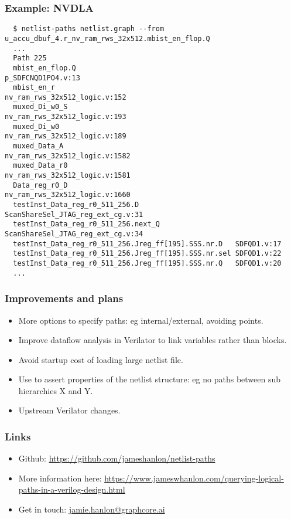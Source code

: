 \documentclass[professionalfonts]{beamer}
\begin{document}
\begin{frame}[fragile]
  \frametitle{Example: NVDLA}
  \tiny
  \begin{verbatim}
  $ netlist-paths netlist.graph --from u_accu_dbuf_4.r_nv_ram_rws_32x512.mbist_en_flop.Q
  ...
  Path 225
  mbist_en_flop.Q                                      p_SDFCNQD1PO4.v:13
  mbist_en_r                                           nv_ram_rws_32x512_logic.v:152
  muxed_Di_w0_S                                        nv_ram_rws_32x512_logic.v:193
  muxed_Di_w0                                          nv_ram_rws_32x512_logic.v:189
  muxed_Data_A                                         nv_ram_rws_32x512_logic.v:1582
  muxed_Data_r0                                        nv_ram_rws_32x512_logic.v:1581
  Data_reg_r0_D                                        nv_ram_rws_32x512_logic.v:1660
  testInst_Data_reg_r0_511_256.D                       ScanShareSel_JTAG_reg_ext_cg.v:31
  testInst_Data_reg_r0_511_256.next_Q                  ScanShareSel_JTAG_reg_ext_cg.v:34
  testInst_Data_reg_r0_511_256.Jreg_ff[195].SSS.nr.D   SDFQD1.v:17
  testInst_Data_reg_r0_511_256.Jreg_ff[195].SSS.nr.sel SDFQD1.v:22
  testInst_Data_reg_r0_511_256.Jreg_ff[195].SSS.nr.Q   SDFQD1.v:20
  ...
  \end{verbatim}
\end{frame}

\begin{frame}
\frametitle{Improvements and plans}
  \begin{itemize}
  \item More options to specify paths: eg internal/external, avoiding points.
  \item Improve dataflow analysis in Verilator to link variables rather than
    blocks.
  \item Avoid startup cost of loading large netlist file.
  \item Use to assert properties of the netlist structure: eg no paths between
    sub hierarchies X and Y.
  \item Upstream Verilator changes.
  \end{itemize}
\end{frame}

\begin{frame}
\frametitle{Links}
  \begin{itemize}
  \item Github:
    \url{https://github.com/jameshanlon/netlist-paths}
  \item More information here:
    \url{https://www.jameswhanlon.com/querying-logical-paths-in-a-verilog-design.html}
  \item Get in touch:
    \url{jamie.hanlon@graphcore.ai}
  \end{itemize}
\end{frame}
\end{document}
